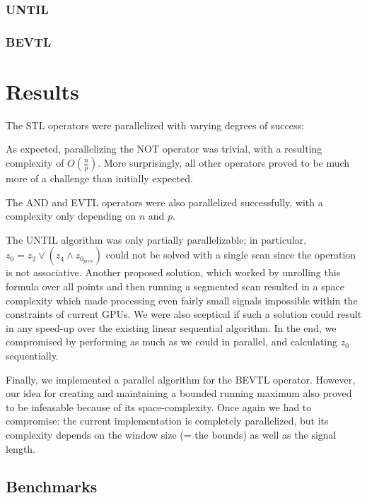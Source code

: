 \documentclass[a4paper,10pt]{article}
\renewcommand{\And}{\wedge}
\newcommand{\Or}{\vee}
\begin{document}
\subsubsection{UNTIL}

\subsubsection{BEVTL}


\section{Results}

The STL operators were parallelized with varying degrees of success:

As expected, parallelizing the NOT operator was trivial, with a resulting complexity of $O(\frac{n}{p})$. More surprisingly, all other
operators proved to be much more of a challenge than initially expected.

The AND and EVTL operators were also parallelized successfully, with a complexity only depending on $n$ and $p$.

The UNTIL algorithm was only partially parallelizable; in particular,
$z_0 = z_2 \Or (z_4 \And z_{0_{prev}})$ could not be solved with a single scan since
the operation is not associative. Another proposed solution, which worked by unrolling this formula over all points
and then running a segmented scan resulted in a space complexity which made processing even fairly small signals impossible within the constraints of current GPUs. We were also sceptical if such a solution could result in any speed-up over
the existing linear sequential algorithm. In the end, we compromised by performing
as much as we could in parallel, and calculating $z_0$ sequentially.

Finally, we implemented a parallel algorithm for the BEVTL operator. However,
our idea for creating and maintaining a bounded running maximum also proved to
be infeasable because of its space-complexity. Once again we had to compromise:
the current implementation is completely parallelized, but its complexity depends
on the window size (= the bounds) as well as the signal length.


\subsection{Benchmarks}
\end{document}
